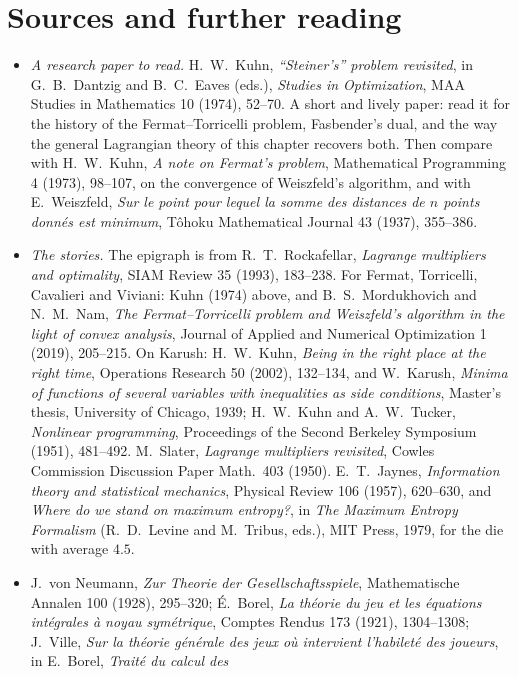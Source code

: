 \section*{Sources and further reading}

\begin{itemize}
\item \emph{A research paper to read.} H.~W.~Kuhn, \emph{``Steiner's'' problem revisited}, in G.~B.~Dantzig and B.~C.~Eaves (eds.), \emph{Studies in Optimization}, MAA Studies in
Mathematics 10 (1974), 52--70. A short and lively paper: read it for the history of the Fermat--Torricelli problem, Fasbender's dual, and the way the general Lagrangian theory
of this chapter recovers both. Then compare with H.~W.~Kuhn, \emph{A note on Fermat's problem}, Mathematical Programming 4 (1973), 98--107, on the convergence of Weiszfeld's
algorithm, and with E.~Weiszfeld, \emph{Sur le point pour lequel la somme des distances de $n$ points donn\'es est minimum}, T\^ohoku Mathematical Journal 43 (1937), 355--386.
\item \emph{The stories.} The epigraph is from R.~T.~Rockafellar, \emph{Lagrange multipliers and optimality}, SIAM Review 35 (1993), 183--238. For Fermat, Torricelli, Cavalieri and
Viviani: Kuhn (1974) above, and B.~S.~Mordukhovich and N.~M.~Nam, \emph{The Fermat--Torricelli problem and Weiszfeld's algorithm in the light of convex analysis}, Journal of
Applied and Numerical Optimization 1 (2019), 205--215. On Karush: H.~W.~Kuhn, \emph{Being in the right place at the right time}, Operations Research 50 (2002), 132--134, and
W.~Karush, \emph{Minima of functions of several variables with inequalities as side conditions}, Master's thesis, University of Chicago, 1939; H.~W.~Kuhn and A.~W.~Tucker,
\emph{Nonlinear programming}, Proceedings of the Second Berkeley Symposium (1951), 481--492. M.~Slater, \emph{Lagrange multipliers revisited}, Cowles Commission Discussion
Paper Math.~403 (1950). E.~T.~Jaynes, \emph{Information theory and statistical mechanics}, Physical Review 106 (1957), 620--630, and \emph{Where do we stand on maximum entropy?},
in \emph{The Maximum Entropy Formalism} (R.~D.~Levine and M.~Tribus, eds.), MIT Press, 1979, for the die with average $4.5$.
\item J.~von Neumann, \emph{Zur Theorie der Gesellschaftsspiele}, Mathematische Annalen 100 (1928), 295--320; \'E.~Borel, \emph{La th\'eorie du jeu et les \'equations int\'egrales \`a noyau
sym\'etrique}, Comptes Rendus 173 (1921), 1304--1308; J.~Ville, \emph{Sur la th\'eorie g\'en\'erale des jeux o\`u intervient l'habilet\'e des joueurs}, in E.~Borel, \emph{Trait\'e du calcul des
}
\end{itemize}
